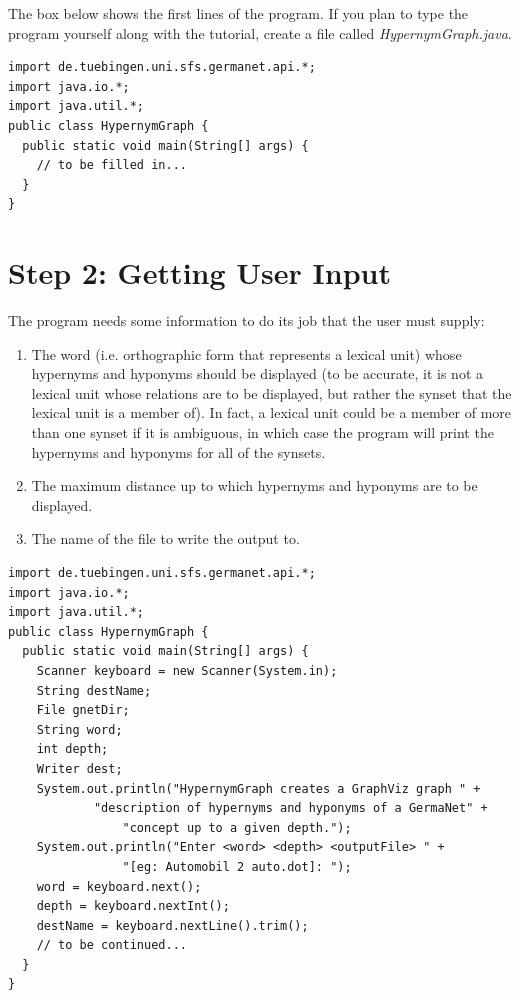 \documentclass[12pt,a4paper,english,utf8]{report}
\begin{document}
The box below shows the first lines of the program. If you plan to type the program yourself along with the tutorial, create a file called \emph{HypernymGraph.java}.

\begin{lstlisting}
import de.tuebingen.uni.sfs.germanet.api.*;
import java.io.*;
import java.util.*;
public class HypernymGraph {
  public static void main(String[] args) {
    // to be filled in...
  }
}
\end{lstlisting}



\section{Step 2: Getting User Input}
The program needs some information to do its job that the user must supply:

\renewcommand{\labelenumi}{•}
\begin{enumerate}
	\item The word (i.e. orthographic form that represents a lexical unit) whose hypernyms and hyponyms should be displayed (to be accurate, it is not a lexical unit whose relations are to be displayed, but rather the synset that the lexical unit is a member of). In fact, a lexical unit could be a member of more than one synset if it is ambiguous, in which case the program will print the hypernyms and hyponyms for all of the synsets.
	\item The maximum distance up to which hypernyms and hyponyms are to be displayed.
	\item The name of the file to write the output to.
\end{enumerate}

\begin{lstlisting}
import de.tuebingen.uni.sfs.germanet.api.*;
import java.io.*;
import java.util.*;
public class HypernymGraph {
  public static void main(String[] args) {
    Scanner keyboard = new Scanner(System.in);
    String destName;
    File gnetDir;
    String word;
    int depth;
    Writer dest;
    System.out.println("HypernymGraph creates a GraphViz graph " +
            "description of hypernyms and hyponyms of a GermaNet" +
                "concept up to a given depth.");
    System.out.println("Enter <word> <depth> <outputFile> " +
                "[eg: Automobil 2 auto.dot]: ");
    word = keyboard.next();
    depth = keyboard.nextInt();
    destName = keyboard.nextLine().trim();
    // to be continued...
  }
}
\end{lstlisting}
\end{document}
